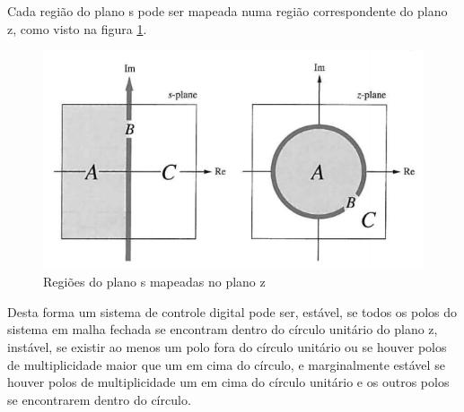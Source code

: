 Cada região do plano s pode ser mapeada numa região correspondente do plano z, como visto na figura \ref{fig:planoestabilidadedigital}.

\begin{figure}
	\centering
	\includegraphics[width=0.7\linewidth]{plano_estabilidade_digital}
	\caption{Regiões do plano s mapeadas no plano z}
	\label{fig:planoestabilidadedigital}
\end{figure}

Desta forma um sistema de controle digital pode ser, estável, se todos os polos do sistema em malha fechada se encontram dentro do círculo unitário do plano z, instável, se existir ao menos um polo fora do círculo unitário ou se houver polos de multiplicidade maior que um em cima do círculo, e marginalmente estável se houver polos de multiplicidade um em cima do círculo unitário e os outros polos se encontrarem dentro do círculo.
















